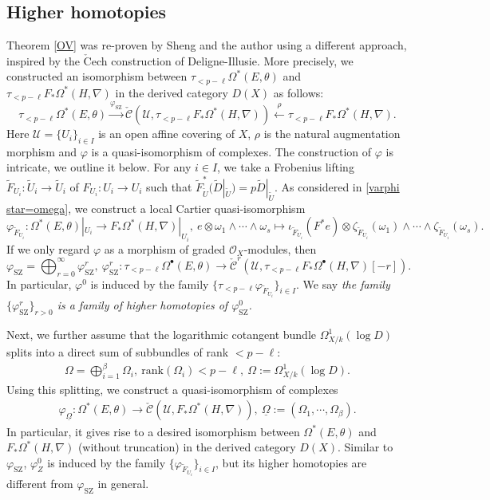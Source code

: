 \documentclass[12pt, a4paper]{article}
\begin{document}
\subsection{Higher homotopies}
Theorem \ref{OV} was re-proven by Sheng and the author\cite{SZ2} using a different approach, inspired by the $\mathrm{\check{C}}$ech construction of Deligne-Illusie\cite{DI}. More precisely, we constructed an isomorphism between $\tau_{<p-\ell}\Omega^*(E,\theta)$ and $\tau_{<p-\ell}F_*\Omega^*(H,\nabla)$ in the derived category $D(X)$ as follows:
$$
\tau_{<p-\ell}\Omega^*(E,\theta)\xrightarrow{\varphi_\mathrm{SZ}}\check{\mathcal C}(\mathcal U,\tau_{<p-\ell}F_*\Omega^*(H,\nabla))\xleftarrow{\rho}\tau_{<p-\ell}F_*\Omega^*(H,\nabla).
$$
Here $\mathcal U=\{U_i\}_{i\in I}$ is an open affine covering of $X$, $\rho$ is the natural augmentation morphism and $\varphi$ is a quasi-isomorphism of complexes. The construction of $\varphi$ is intricate, we outline it below. For any $i\in I$, we take a Frobenius lifting $\tilde F_{U_i}:\tilde U_i\to\tilde U_i$ of $F_{U_i}:U_i\to U_i$ such that $\tilde F^*_{\tilde U}(\tilde D|_{\tilde U})=p\tilde D|_{\tilde U}$. As considered in \eqref{varphi star=omega}, we construct a local Cartier quasi-isomorphism
$$
\varphi_{\tilde F_{U_i}}:\Omega^*(E,\theta)|_{U_i}\to F_*\Omega^*(H,\nabla)|_{U_i},~e\otimes\omega_1\wedge\cdots\wedge\omega_s\mapsto \iota_{\tilde F_{U_i}}(F^*e)\otimes\zeta_{\tilde F_{U_i}}(\omega_1)\wedge\cdots\wedge\zeta_{\tilde F_{U_i}}(\omega_s).
$$
 If we only regard $\varphi$ as a morphism of graded $\mathcal O_X$-modules, then
$$
\varphi_\mathrm{SZ}=\bigoplus_{r=0}^\infty\varphi_\mathrm{SZ}^r,~\varphi_\mathrm{SZ}^r:\tau_{<p-\ell}\Omega^\bullet(E,\theta)\to\check{\mathcal C}^r(\mathcal U,\tau_{<p-\ell}F_*\Omega^\bullet(H,\nabla)[-r]).
$$
In particular, $\varphi^0$ is induced by the family $\{\tau_{<p-\ell}\varphi_{\tilde F_{U_i}}\}_{i\in I}$. We say \emph{the family $\{\varphi_\mathrm{SZ}^r\}_{r>0}$ is a family of higher homotopies of $\varphi^0_{\mathrm{SZ}}$.}

Next, we further assume that the logarithmic cotangent bundle $\Omega^1_{X/k}(\log D)$ splits into a direct sum of subbundles of rank $<p-\ell$:
\begin{eqnarray}\label{splitting cotangent bundle}
\Omega=\bigoplus_{i=1}^\beta\Omega_i,~\mathrm{rank}(\Omega_i)<p-\ell,~\Omega:=\Omega^1_{X/k}(\log D).
\end{eqnarray}
Using this splitting, we construct a quasi-isomorphism of complexes
\begin{eqnarray}\label{Cech quasi-iso without truncation}
\varphi_{\underline \Omega}:\Omega^*(E,\theta)\to\check{\mathcal C}(\mathcal U,F_*\Omega^*(H,\nabla)),~\underline\Omega:=(\Omega_1,\cdots,\Omega_\beta).
\end{eqnarray}
In particular, it gives rise to a desired isomorphism between $\Omega^*(E,\theta)$ and $F_*\Omega^*(H,\nabla)$ (without truncation) in the derived category $D(X)$. Similar to $\varphi_\mathrm{SZ}$, $\varphi_Z^0$ is induced  by the family $\{\varphi_{\tilde F_{U_i}}\}_{i\in I}$, but its higher homotopies are different from $\varphi_\mathrm{SZ}$ in general.
\end{document}
